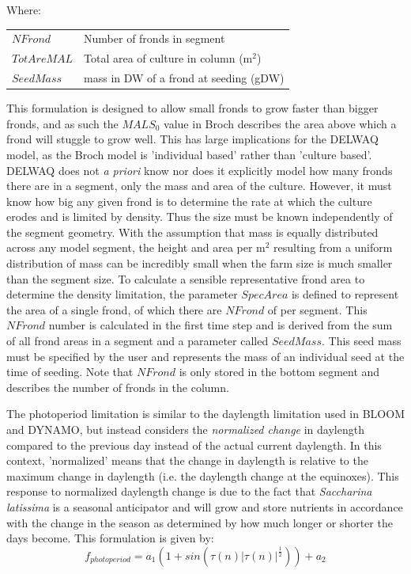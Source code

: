 \documentclass{deltares_manual}
\begin{document}
Where:\\

\begin{tabular}{ll}
	$NFrond$ & Number of fronds in segment\\
	$TotAreMAL$    & Total area of culture in column (m$^2$)\\
	$SeedMass$ & mass in DW of a frond at seeding (gDW)\\
\end{tabular}

This formulation is designed to allow small fronds to grow faster than bigger fronds, and as such the $MALS_0$ value in Broch describes the area above which a frond will stuggle to grow well. This has large implications for the DELWAQ model, as the Broch model is 'individual based' rather than 'culture based'. DELWAQ does not \textit{a priori} know nor does it explicitly model how many fronds there are in a segment, only the mass and area of the culture. However, it must know how big any given frond is to determine the rate at which the culture erodes and is limited by density. Thus the size must be known independently of the segment geometry. With the assumption that mass is equally distributed across any model segment, the height and area per m$^2$ resulting from a uniform distribution of mass can be incredibly small when the farm size is much smaller than the segment size. To calculate a sensible representative frond area to determine the density limitation, the parameter $SpecArea$ is defined to represent the area of a single frond, of which there are $NFrond$ of per segment. This $NFrond$ number is calculated in the first time step and is derived from the sum of all frond areas in a segment and a parameter called $SeedMass$. This seed mass must be specified by the user and represents the mass of an individual seed at the time of seeding. Note that $NFrond$ is only stored in the bottom segment and describes the number of fronds in the column.

The photoperiod limitation is similar to the daylength limitation used in BLOOM and DYNAMO, but instead considers the \textit{normalized change} in daylength compared to the previous day instead of the actual current daylength. In this context, 'normalized' means that the change in daylength is relative to the maximum change in daylength (i.e. the daylength change at the equinoxes). This response to normalized daylength change is due to the fact that \textit{Saccharina latissima} is a seasonal anticipator and will grow and store nutrients in accordance with the change in the season as determined by how much longer or shorter the days become. This formulation is given by: 
\begin{equation}
f_{photoperiod} = a_1 (1+sin(\tau (n) | \tau (n)| ^{\frac{1}{2}})) + a_2
\end{equation}
\end{document}
